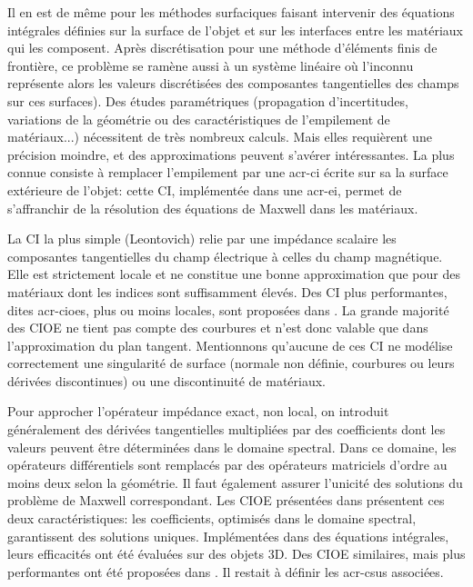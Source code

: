 Il en est de même pour les méthodes surfaciques faisant intervenir des équations intégrales définies sur la surface de l'objet et sur les interfaces entre les matériaux qui les composent. Après discrétisation pour une méthode d’éléments finis de frontière, ce problème se ramène aussi à un système linéaire où l'inconnu représente alors les valeurs discrétisées des composantes tangentielles des champs sur ces surfaces).
Des études paramétriques (propagation d’incertitudes, variations de la géométrie ou des caractéristiques de l'empilement de matériaux...) nécessitent de très nombreux calculs.
Mais elles requièrent une précision moindre, et des approximations peuvent s'avérer intéressantes.
La plus connue consiste à remplacer l'empilement par une \gls{acr-ci} écrite sur sa la surface extérieure de l'objet: cette CI, implémentée dans une \gls{acr-ei}, permet de s’affranchir de la résolution des équations de Maxwell dans les matériaux.

La CI la plus simple (Leontovich) relie par une impédance scalaire les composantes tangentielles du champ électrique à celles du champ magnétique.
Elle est strictement locale et ne constitue une bonne approximation que pour des matériaux dont les indices sont suffisamment élevés.
Des CI plus performantes, dites \glspl{acr-cioe}, plus ou moins locales, sont proposées dans \cite{hoppe_impedance_1995,stupfel_implementation_2015}.
La grande majorité des CIOE ne tient pas compte des courbures et n’est donc valable que dans l'approximation du plan tangent.
Mentionnons qu'aucune de ces CI ne modélise correctement une singularité de surface (normale non définie, courbures ou leurs dérivées discontinues) ou une discontinuité de matériaux.

Pour approcher l’opérateur impédance exact, non local, on introduit généralement des dérivées tangentielles multipliées par des coefficients dont les valeurs peuvent être déterminées dans le domaine spectral. Dans ce domaine, les opérateurs différentiels sont remplacés par des opérateurs matriciels d'ordre au moins deux selon la géométrie.
Il faut également assurer l’unicité des solutions du problème de Maxwell correspondant.
Les CIOE présentées dans \cite{stupfel_sufficient_2011,stupfel_implementation_2015} présentent ces deux caractéristiques: les coefficients, optimisés dans le domaine spectral, garantissent des solutions uniques.
Implémentées dans des équations intégrales, leurs efficacités ont été évaluées sur des objets 3D.
Des CIOE similaires, mais plus performantes ont été proposées dans \cite{marceaux_high-order_2000,aubakirov_electromagnetic_2014,soudais_3d_2017}.
Il restait à définir les \glspl{acr-csu} associées.

